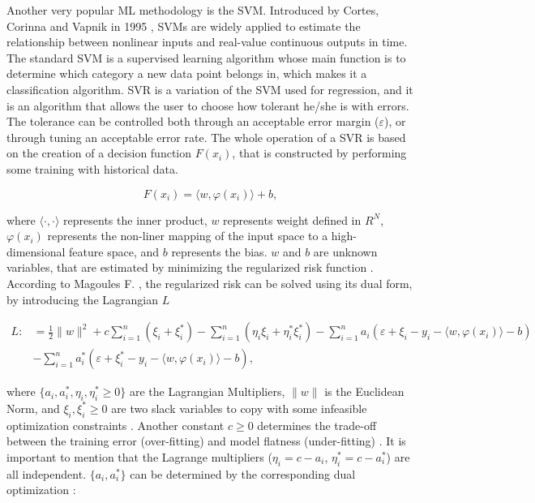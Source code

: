 Another very popular \ac{ML} methodology is the \ac{SVM}. Introduced by Cortes, Corinna and Vapnik in 1995 \cite{svm1}, \ac{SVM}s are widely applied to estimate the relationship between nonlinear inputs and real-value continuous outputs in time. The standard \ac{SVM} is a supervised learning algorithm whose main function is to determine which category a new data point belongs in, which makes it a classification algorithm. \ac{SVR} is a variation of the \ac{SVM} used for regression, and it is an algorithm that allows the user to choose how tolerant he/she is with errors. The tolerance can be controlled both through an acceptable error margin ($\varepsilon$), or through tuning an acceptable error rate. The whole operation of a \ac{SVR} is based on the creation of a decision function $F(x_i)$, that is constructed by performing some training with historical data.

\begin{equation}
   F(x_i) = \langle w, \varphi(x_i) \rangle + b,
   \label{svmdec}
\end{equation}

where $\langle\cdot,\cdot\rangle$ represents the inner product, $w$ represents weight defined in $R^N$, $\varphi(x_i)$ represents the non-liner mapping of the input space to a high-dimensional feature space, and $b$ represents the bias\cite{svm2}. $w$ and $b$ are unknown variables, that are estimated by minimizing the regularized risk function \cite{svm2}. According to Magoules F. \cite{ann1}, the regularized risk can be solved using its dual form, by introducing the Lagrangian $L$

\begin{equation}
\begin{split}
       L  :&= \frac{1}{2}\parallel w \parallel^2 + c \sum_{i=1}^{n}(\xi_i + \xi_i^*) - \sum_{i=1}^{n}(\eta_i\xi_i + \eta_i^*\xi_i^*) - \sum_{i=1}^{n}a_i(\varepsilon + \xi_i - y_i- \langle w, \varphi(x_i) \rangle - b) \\ 
         & - \sum_{i=1}^{n}a_i^*(\varepsilon + \xi_i^* - y_i- \langle w, \varphi(x_i) \rangle - b),
\end{split}
\end{equation}

where $\{a_i, a_i^*, \eta_i, \eta_i^*\geq 0\}$ are the Lagrangian Multipliers, $\parallel w \parallel$ is the Euclidean Norm, and ${{\xi_i,\xi_i^*\geq 0}}$ are two slack variables to copy with some infeasible optimization constraints \cite{review2017}. Another constant $c \geq 0$ determines the trade-off between the training error (over-fitting) and model flatness (under-fitting) \cite{review2017}. 
It is important to mention that the Lagrange multipliers ($\eta_i = c - a_i$, $\eta_i^* = c-a_i^*$) are all independent. $\{a_i, a_i^*\}$ can be determined by the corresponding dual optimization \cite{ann1}:

